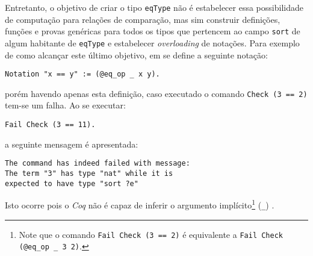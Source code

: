 Entretanto, o objetivo de criar o tipo \lstinline[language = coq]$eqType$ não é estabelecer essa possibilidade de computação para relações de comparação, mas sim construir definições, funções e provas genéricas para todos os tipos que pertencem ao campo \lstinline[language = coq]$sort$ de algum habitante de \lstinline[language = coq]$eqType$ e estabelecer \textit{overloading} de notações. Para exemplo de como alcançar este último objetivo, em \cite{assia_mahboubi_2022_7118596} se define a seguinte notação:
\begin{lstlisting}[language=coq,frame=single,tabsize=1]
Notation "x == y" := (@eq_op _ x y).
\end{lstlisting}
porém havendo apenas esta definição, caso executado o comando \lstinline[language = coq]$Check (3 == 2)$ tem-se um falha. Ao se executar:
    \begin{lstlisting}[language=coq,frame=single,tabsize=1]
Fail Check (3 == 11).
    \end{lstlisting}
a seguinte mensagem é apresentada:
    \begin{lstlisting}[language=coq-error,frame=single,tabsize=1]
The command has indeed failed with message:
The term "3" has type "nat" while it is 
expected to have type "sort ?e"
    \end{lstlisting}
Isto ocorre pois o \textit{Coq} não é capaz de inferir o argumento implícito\footnote{Note que o comando \lstinline[language = coq]$Fail Check (3 == 2)$ é equivalente a \lstinline[language = coq]$Fail Check (@eq_op _ 3 2)$.}  (\lstinline[language = coq]$_$) \cite{assia_mahboubi_2022_7118596}.

